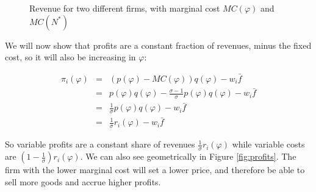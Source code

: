 \documentclass[11pt,letterpaper]{article}
\begin{document}
\begin{figure}
    \caption{Revenue for two different firms, with marginal cost $MC(\varphi)$ and $MC(N^*)$ }
    \label{fig:revenues}
\end{figure}

We will now show that profits are a constant fraction of revenues, minus the fixed cost, so it will also be increasing in $\varphi$:

\begin{eqnarray*}
    \pi_i(\varphi) &=& \left(p(\varphi) - MC(\varphi) \right) q(\varphi) - w_i \bar{f}  \\
    &=& p(\varphi)q(\varphi) - \frac{\sigma-1}{\sigma} p(\varphi) q(\varphi) - w_i \bar{f}  \\
    &=& \frac{1}{\sigma} p(\varphi)q(\varphi) - w_i \bar{f}  \\
    &=& \frac{1}{\sigma} r_i(\varphi) - w_i \bar{f} 
\end{eqnarray*}

So variable profits are a constant share of revenues $\frac{1}{\sigma} r_i(\varphi)$ while variable costs are $\left(1-\frac{1}{\sigma}\right) r_i(\varphi)$. We can also see geometrically in Figure \ref{fig:profits}. The firm with the lower marginal cost will set a lower price, and therefore be able to sell more goods and accrue higher profits.
\end{document}
